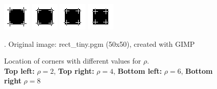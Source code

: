 \begin{figure}[h]
    \centering
    \includegraphics[width=0.4\linewidth]{../Images/rect/rect_2_corner.png}
    \includegraphics[width=0.4\linewidth]{../Images/rect/rect_4_corner.png}
    \includegraphics[width=0.4\linewidth]{../Images/rect/rect_6_corner.png}
    \includegraphics[width=0.4\linewidth]{../Images/rect/rect_8_corner.png}
    \caption{Location of corners with different values for $\rho$.\\
\textbf{Top left:} $\rho=2$, \textbf{Top right:} $\rho=4$, \textbf{Bottom left:}
$\rho=6$, \textbf{Bottom right} $\rho=8$}. Original image: rect\_tiny.pgm (50x50), created with
GIMP
    \label{fig:Integration}
\end{figure}
